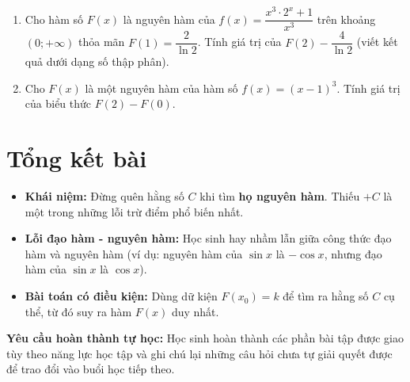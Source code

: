 \documentclass[12pt]{article}
\begin{document}
\begin{enumerate}[label=\textbf{Câu \arabic*.}, start=1]
		
		\item Cho hàm số $F(x)$ là nguyên hàm của $f(x) = \dfrac{x^3 \cdot 2^x + 1}{x^3}$ trên khoảng $(0; +\infty)$ thỏa mãn $F(1) = \dfrac{2}{\ln 2}$. Tính giá trị của $F(2) - \dfrac{4}{\ln 2}$ (viết kết quả dưới dạng số thập phân).
		
		
		\item Cho $F(x)$ là một nguyên hàm của hàm số $f(x) = (x - 1)^3$. Tính giá trị của biểu thức $F(2) - F(0)$.


	\end{enumerate}
	
	\newpage
	
	\section{Tổng kết bài}
	
	\begin{tcolorbox}[colback=yellow!10!white, colframe=orange!60!black,
		fonttitle=\bfseries, title={Tóm tắt sơ đồ tư duy \& Các lỗi thường gặp}]
		\begin{itemize}
			\item \textbf{Khái niệm:} Đừng quên hằng số $C$ khi tìm \textbf{họ nguyên hàm}. Thiếu $+ C$ là một trong những lỗi trừ điểm phổ biến nhất.
			\item \textbf{Lỗi đạo hàm - nguyên hàm:} Học sinh hay nhầm lẫn giữa công thức đạo hàm và nguyên hàm (ví dụ: nguyên hàm của $\sin x$ là $-\cos x$, nhưng đạo hàm của $\sin x$ là $\cos x$).
			\item \textbf{Bài toán có điều kiện:} Dùng dữ kiện $F(x_0) = k$ để tìm ra hằng số $C$ cụ thể, từ đó suy ra hàm $F(x)$ duy nhất.
		\end{itemize}
	\end{tcolorbox}
	
	\vspace{3mm}
	\textbf{Yêu cầu hoàn thành tự học:} Học sinh hoàn thành các phần bài tập được giao tùy theo năng lực học tập và ghi chú lại những câu hỏi chưa tự giải quyết được để trao đổi vào buổi học tiếp theo.
	
\end{document}
